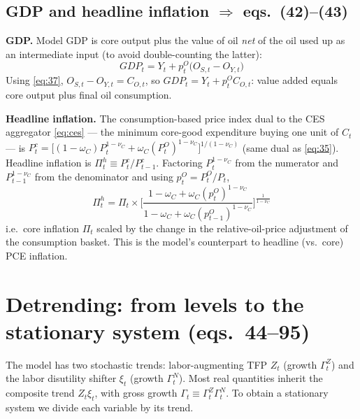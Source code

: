 \subsection{GDP and headline inflation \texorpdfstring{$\Rightarrow$}{=>} eqs.\ (42)--(43)}
\textbf{GDP.} Model GDP is core output plus the value of oil \emph{net} of the oil used up as an
intermediate input (to avoid double-counting the latter):
\begin{equation}\label{eq:42}
\boxed{\,GDP_t=Y_t+p^O_t\big(O_{S,t}-O_{Y,t}\big)\,}\tag{P-42}
\end{equation}
Using \eqref{eq:37}, $O_{S,t}-O_{Y,t}=C_{O,t}$, so $GDP_t=Y_t+p^O_tC_{O,t}$: value added equals core
output plus final oil consumption.

\medskip
\noindent\textbf{Headline inflation.} The consumption-based price index dual to the CES aggregator
\eqref{eq:ces} --- the minimum core-good expenditure buying one unit of $C_t$ --- is
$P^c_t=\big[(1-\omega_C)P_t^{1-\nu_C}+\omega_C(P^O_t)^{1-\nu_C}\big]^{1/(1-\nu_C)}$ (same dual as
\eqref{eq:35}). Headline inflation is $\Pi^h_t\equiv P^c_t/P^c_{t-1}$. Factoring $P_t^{1-\nu_C}$ from
the numerator and $P_{t-1}^{1-\nu_C}$ from the denominator and using $p^O_t=P^O_t/P_t$,
\begin{equation}\label{eq:43}
\boxed{\,\Pi^h_t=\Pi_t\times\Big[\frac{1-\omega_C+\omega_C(p^O_t)^{1-\nu_C}}{1-\omega_C+\omega_C(p^O_{t-1})^{1-\nu_C}}\Big]^{\frac{1}{1-\nu_C}}\,}\tag{P-43}
\end{equation}
i.e.\ core inflation $\Pi_t$ scaled by the change in the relative-oil-price adjustment of the
consumption basket. This is the model's counterpart to headline (vs.\ core) PCE inflation.

\section{Detrending: from levels to the stationary system (eqs.\ 44--95)}\label{sec:detrend}

The model has two stochastic trends: labor-augmenting TFP $Z_t$ (growth $\Gamma^Z_t$) and the labor
disutility shifter $\xi_t$ (growth $\Gamma^N_t$). Most real quantities inherit the composite trend
$Z_t\xi_t$, with gross growth $\Gamma_t\equiv\Gamma^Z_t\Gamma^N_t$. To obtain a stationary system we
divide each variable by its trend.

